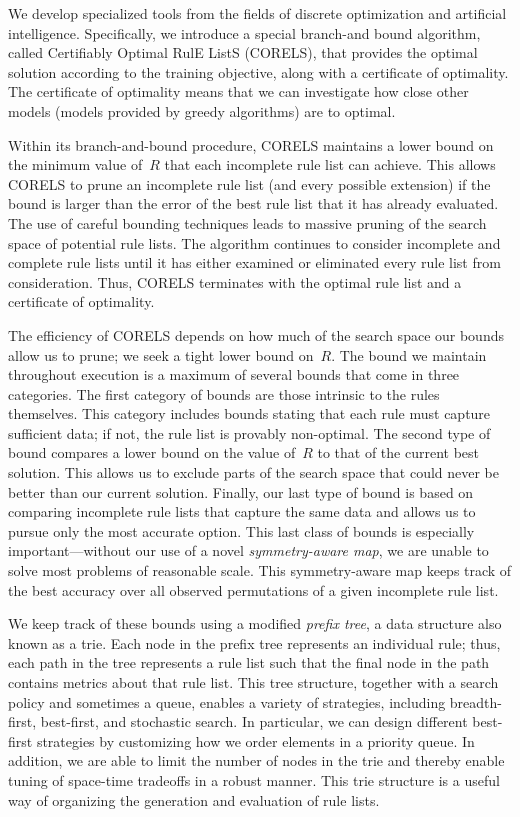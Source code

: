 We develop specialized tools from the fields of discrete optimization and artificial intelligence.
%
Specifically, we introduce a special branch-and bound algorithm, called
Certifiably Optimal RulE ListS (CORELS), that provides the optimal solution
according to the training objective, along with a certificate of optimality.
%
The certificate of optimality means that we can investigate how close other models
(\eg models provided by greedy algorithms) are to optimal.

\begin{arxiv}
Within its branch-and-bound procedure, CORELS maintains a lower bound on the
minimum value of~$R$ that each incomplete rule list can achieve.
%
This allows CORELS to prune an incomplete rule list (and every possible extension)
if the bound is larger than the error of the best rule list that it has already evaluated.
%
The use of careful bounding techniques leads to massive pruning of
the search space of potential rule lists.
%
The algorithm continues to consider incomplete and complete rule lists until it has either
examined or eliminated every rule list from consideration.
%
Thus, CORELS terminates with the optimal rule list and a certificate of optimality.
\end{arxiv}

The efficiency of CORELS depends on how much of the search space our bounds
allow us to prune; we seek a tight lower bound on~$R$.
%
The bound we maintain throughout execution is a maximum of several bounds
that come in three categories.
%
The first category of bounds are those intrinsic to the rules themselves.
%
This category includes bounds stating that each rule must capture sufficient data;
if not, the rule list is provably non-optimal.
%
The second type of bound compares a lower bound on the value of~$R$
to that of the current best solution.
%
This allows us to exclude parts of the search space that could never be better
than our current solution.
%
Finally, our last type of bound is based on comparing incomplete rule lists that
capture the same data and allows us to pursue only the most accurate option.
%
This last class of bounds is especially important---without our use of a novel
\textit{symmetry-aware map}, we are unable to solve most problems of reasonable scale.
%
This symmetry-aware map keeps track of the best accuracy
over all observed permutations of a given incomplete rule list.

We keep track of these bounds using a modified \emph{prefix tree},
a data structure also known as a trie.
%
Each node in the prefix tree represents an individual rule;
thus, each path in the tree represents a rule list such that
the final node in the path contains metrics about that rule list.
%
This tree structure, together with a search policy and sometimes a queue,
enables a variety of strategies, including breadth-first,
best-first, and stochastic search.
%
In particular, we can design different best-first strategies
by customizing how we order elements in a priority queue.
%
In addition, we are able to limit the number of nodes in the trie
and thereby enable tuning of space-time tradeoffs in a robust manner.
%
This trie structure is a useful way of organizing the generation
and evaluation of rule lists.

